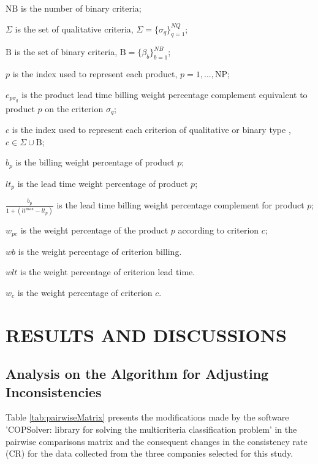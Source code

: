\documentclass[10pt,fleqn,a4paper,twoside]{article}
\begin{document}
$\textrm{NB}$ is the number of binary criteria;

$\Sigma$ is the set of qualitative criteria, \quad $\Sigma = \{\sigma_q\}_{q=1}^{NQ}$;

$\textrm{B}$ is the set of binary criteria, \quad $\textrm{B} = \{\beta_b\}_{b=1}^{NB}$;

$p$ is the index used to represent each product, \quad $p= 1,...,\textrm{NP}$;

$e_{p\sigma_q}$ is the product lead time billing weight percentage complement equivalent to product $p$ on the criterion $\sigma_q$;

$c$ is the index used to represent each criterion of qualitative or binary type , \quad $c \in \Sigma \cup \textrm{B}$;
 
$b_p$ is the billing weight percentage of product $p$;

$lt_p$ is the lead time weight percentage of product $p$;

$\frac{b_p}{1 + (lt^{\max} - lt_p)}$ is the lead time billing weight percentage complement for product $p$;

$w_{pc}$ is the weight percentage of the product $p$ according to criterion $c$;

$wb$ is the weight percentage of criterion billing.

$wlt$ is the weight percentage of criterion lead time.

$w_{c}$ is the weight percentage of criterion $c$.

    
    \section{RESULTS AND DISCUSSIONS}
    
    \subsection{Analysis on the Algorithm for Adjusting Inconsistencies}
    
    Table \ref{tab:pairwiseMatrix} presents the modifications made by the software 'COPSolver: library for solving the multicriteria classification problem' in the pairwise comparisons matrix and the consequent changes in the consistency rate (CR) for the data collected from the three companies selected for this study.
\end{document}
